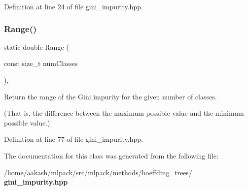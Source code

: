Definition at line 24 of file gini\+\_\+impurity.\+hpp.

\mbox{\label{classmlpack_1_1tree_1_1GiniImpurity_a9d801bb1be5db5207213f846f224458f}} 
\subsubsection{Range()}
{\footnotesize\ttfamily static double Range (\begin{DoxyParamCaption}\item[{const size\+\_\+t}]{num\+Classes }\end{DoxyParamCaption})\hspace{0.3cm}{\ttfamily [inline]}, {\ttfamily [static]}}



Return the range of the Gini impurity for the given number of classes. 

(That is, the difference between the maximum possible value and the minimum possible value.) 

Definition at line 77 of file gini\+\_\+impurity.\+hpp.



The documentation for this class was generated from the following file\+:\begin{DoxyCompactItemize}
\item 
/home/aakash/mlpack/src/mlpack/methods/hoeffding\+\_\+trees/\textbf{ gini\+\_\+impurity.\+hpp}\end{DoxyCompactItemize}
